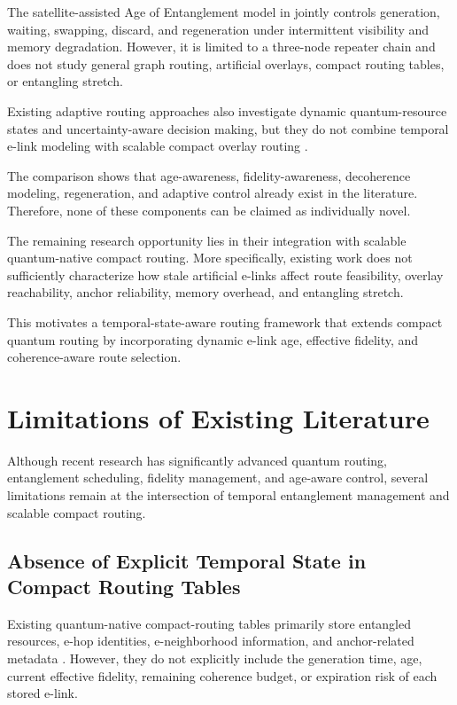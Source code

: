 The satellite-assisted Age of Entanglement model in \cite{ceran2026age} jointly controls generation, waiting, swapping, discard, and regeneration under intermittent visibility and memory degradation. However, it is limited to a three-node repeater chain and does not study general graph routing, artificial overlays, compact routing tables, or entangling stretch.

Existing adaptive routing approaches also investigate dynamic quantum-resource states and uncertainty-aware decision making, but they do not combine temporal e-link modeling with scalable compact overlay routing \cite{das2021adaptive,xu2023quantumnetwork,li2024adaptive}.

The comparison shows that age-awareness, fidelity-awareness, decoherence modeling, regeneration, and adaptive control already exist in the literature. Therefore, none of these components can be claimed as individually novel.

The remaining research opportunity lies in their integration with scalable quantum-native compact routing. More specifically, existing work does not sufficiently characterize how stale artificial e-links affect route feasibility, overlay reachability, anchor reliability, memory overhead, and entangling stretch.

This motivates a temporal-state-aware routing framework that extends compact quantum routing by incorporating dynamic e-link age, effective fidelity, and coherence-aware route selection.

\section{Limitations of Existing Literature}

Although recent research has significantly advanced quantum routing, entanglement scheduling, fidelity management, and age-aware control, several limitations remain at the intersection of temporal entanglement management and scalable compact routing.

\subsection{Absence of Explicit Temporal State in Compact Routing Tables}

Existing quantum-native compact-routing tables primarily store entangled resources, e-hop identities, e-neighborhood information, and anchor-related metadata \cite{caleffi2025quantumarchitecture}. However, they do not explicitly include the generation time, age, current effective fidelity, remaining coherence budget, or expiration risk of each stored e-link.

